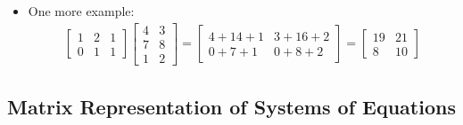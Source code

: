 \begin{itemize}
    \item One more example:
    \begin{align*}
        \begin{bmatrix}
            1 & 2 & 1 \\
            0 & 1 & 1
        \end{bmatrix}
        \begin{bmatrix}
            4 & 3 \\
            7 & 8 \\
            1 & 2
        \end{bmatrix} 
        = 
        \begin{bmatrix}
            4 + 14 + 1 & 3 + 16 + 2 \\
            0 + 7 + 1 & 0 + 8 + 2 
        \end{bmatrix}
        = 
        \begin{bmatrix}
            19 & 21 \\
            8 & 10
        \end{bmatrix}
    \end{align*}
\end{itemize}


\subsection{Matrix Representation of Systems of Equations}


